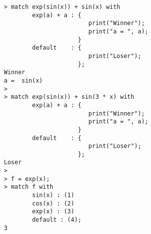 \begin{center}\begin{minipage}{15cm}\begin{Verbatim}[frame=single]
> match exp(sin(x)) + sin(x) with
        exp(a) + a : {
                        print("Winner");
                        print("a = ", a);
                     }
        default    : {
                        print("Loser");
                     };
Winner
a =  sin(x)
> 
> match exp(sin(x)) + sin(3 * x) with
        exp(a) + a : {
                        print("Winner");
                        print("a = ", a);
                     }
        default    : {
                        print("Loser");
                     };
Loser
> 
> f = exp(x);
> match f with
        sin(x) : (1)
        cos(x) : (2)
        exp(x) : (3)
        default : (4);
3
\end{Verbatim}
\end{minipage}\end{center}
